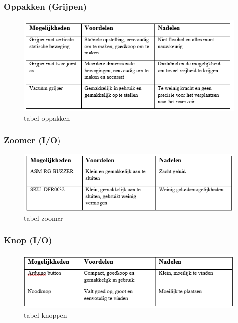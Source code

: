 \documentclass[12pt]{article} %
\begin{document}
\subsubsection{Oppakken (Grijpen)}
\begin{center}
\begin{figure}[h]
\includegraphics[scale=1.]{tabelOppakken.png}
\caption{tabel oppakken}
\label{fig:deployment}
\end{figure}
\end{center}


\subsubsection{Zoomer (I/O)}
\begin{center}
\begin{figure}[h]
\includegraphics[scale=1.]{tabelZoomer.png}
\caption{tabel zoomer}
\label{fig:deployment}
\end{figure}
\end{center}
\clearpage

\subsubsection{Knop (I/O)}
\begin{center}
\begin{figure}[h]
\includegraphics[scale=1.]{tabelKnop.png}
\caption{tabel knoppen}
\label{fig:deployment}
\end{figure}
\end{center}
\end{document}
